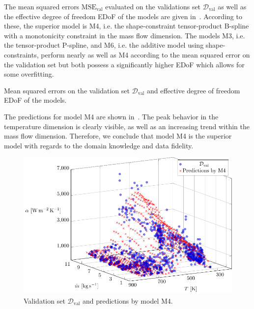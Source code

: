 The mean squared errors $\mathrm{MSE}_{\mathrm{val}}$ evaluated on the validations set $\mathcal{D}_{\text{val}}$ as well as the effective degree of freedom EDoF of the models are given in~. According to these, the superior model is M4, i.e. the shape-constraint tensor-product B-spline with a monotonicity constraint in the mass flow dimension. The models M3, i.e. the tensor-product P-spline, and M6, i.e. the additive model using shape-constraints, perform nearly as well as M4 according to the mean squared error on the validation set but both possess a significantly higher EDoF which allows for some overfitting. 

\begin{table}[H]
	\begin{center}
	\end{center}
	\caption{Mean squared errors on the validation set $\mathcal{D}_{\text{val}}$ and effective degree of freedom EDoF of the models.}
	\label{tab:ebner-mse-val}
\end{table}

The predictions for model M4 are shown in~. The peak behavior in the temperature dimension is clearly visible, as well as an increasing trend within the mass flow dimension. Therefore, we conclude that model M4 is the superior model with regards to the domain knowledge and data fidelity. 

\begin{figure}[H]
	\centering
	\includegraphics[width=\columnwidth]{graphics/pgfplots/cha5/Ebner/M4.pdf}
	\caption{Validation set $\mathcal{D}_{\text{val}}$ and predictions by model M4.}
	\label{fig:ebner-M4}
\end{figure}

